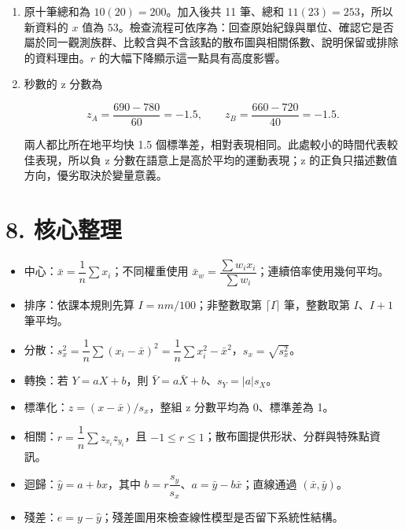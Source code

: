 \documentclass[11pt,a4paper]{article}
\providecommand{\tightlist}{%
  \setlength{\itemsep}{0pt}\setlength{\parskip}{0pt}}
\begin{document}
\begin{enumerate}
  \[
  \hat y-420=10.5(x-28),
  \]

  即 \(\boxed{\hat y=126+10.5x}\)。\(x=30\) 時，\(\hat y=441\text{ kWh}\)。\(45^\circ\mathrm C\) 遠離觀測範圍，線性趨勢是否持續缺乏資料支持；設備容量與用電行為也可能在極端高溫改變。
\item
  原十筆總和為 \(10(20)=200\)。加入後共 11 筆、總和 \(11(23)=253\)，所以新資料的 \(x\) 值為 \(\boxed{53}\)。檢查流程可依序為：回查原始紀錄與單位、確認它是否屬於同一觀測族群、比較含與不含該點的散布圖與相關係數、說明保留或排除的資料理由。\(r\) 的大幅下降顯示這一點具有高度影響。
\item
  秒數的 z 分數為

  \[
  z_A=\frac{690-780}{60}=-1.5,
  \qquad
  z_B=\frac{660-720}{40}=-1.5.
  \]

  兩人都比所在地平均快 1.5 個標準差，相對表現相同。此處較小的時間代表較佳表現，所以負 z 分數在語意上是高於平均的運動表現；z 的正負只描述數值方向，優劣取決於變量意義。
\end{enumerate}

\section{8. 核心整理}\label{ux6838ux5fc3ux6574ux7406}

\begin{itemize}
\tightlist
\item
  中心：\(\bar x=\dfrac1n\sum x_i\)；不同權重使用 \(\bar x_w=\dfrac{\sum w_ix_i}{\sum w_i}\)；連續倍率使用幾何平均。
\item
  排序：依課本規則先算 \(I=nm/100\)；非整數取第 \(\lceil I\rceil\) 筆，整數取第 \(I\)、\(I+1\) 筆平均。
\item
  分散：\(s_x^2=\dfrac1n\sum(x_i-\bar x)^2=\dfrac1n\sum x_i^2-\bar x^2\)，\(s_x=\sqrt{s_x^2}\)。
\item
  轉換：若 \(Y=aX+b\)，則 \(\bar Y=a\bar X+b\)、\(s_Y=|a|s_X\)。
\item
  標準化：\(z=(x-\bar x)/s_x\)，整組 z 分數平均為 0、標準差為 1。
\item
  相關：\(r=\dfrac1n\sum z_{x_i}z_{y_i}\)，且 \(-1\le r\le1\)；散布圖提供形狀、分群與特殊點資訊。
\item
  迴歸：\(\hat y=a+bx\)，其中 \(b=r\dfrac{s_y}{s_x}\)、\(a=\bar y-b\bar x\)；直線通過 \((\bar x,\bar y)\)。
\item
  殘差：\(e=y-\hat y\)；殘差圖用來檢查線性模型是否留下系統性結構。
\end{itemize}
\end{document}
